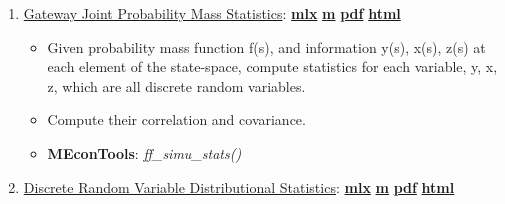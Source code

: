\documentclass[
]{book}
\providecommand{\tightlist}{%
  \setlength{\itemsep}{0pt}\setlength{\parskip}{0pt}}
\begin{document}
\begin{enumerate}
\def\labelenumi{\arabic{enumi}.}
\tightlist
\item
  \href{https://fanwangecon.github.io/MEconTools/MEconTools/doc/stats/htmlpdfm/fx_simu_stats.html}{Gateway Joint Probability Mass Statistics}: \href{https://github.com/FanWangEcon/MEconTools/blob/master/MEconTools/doc/stats/fx_simu_stats.mlx}{\textbf{mlx}} \textbar{} \href{https://github.com/FanWangEcon/MEconTools/blob/master/MEconTools/doc/stats/htmlpdfm/fx_simu_stats.m}{\textbf{m}} \textbar{} \href{https://github.com/FanWangEcon/MEconTools/blob/master/MEconTools/doc/stats/htmlpdfm/fx_simu_stats.pdf}{\textbf{pdf}} \textbar{} \href{https://fanwangecon.github.io/MEconTools/MEconTools/doc/stats/htmlpdfm/fx_simu_stats.html}{\textbf{html}}

  \begin{itemize}
  \tightlist
  \item
    Given probability mass function f(s), and information y(s), x(s), z(s) at each element of the state-space, compute statistics for each variable, y, x, z, which are all discrete random variables.
  \item
    Compute their correlation and covariance.
  \item
    \textbf{MEconTools}: \emph{ff\_simu\_stats()}
  \end{itemize}
\item
  \href{https://fanwangecon.github.io/MEconTools/MEconTools/doc/stats/htmlpdfm/fx_disc_rand_var_stats.html}{Discrete Random Variable Distributional Statistics}: \href{https://github.com/FanWangEcon/MEconTools/blob/master/MEconTools/doc/stats/fx_disc_rand_var_stats.mlx}{\textbf{mlx}} \textbar{} \href{https://github.com/FanWangEcon/MEconTools/blob/master/MEconTools/doc/stats/htmlpdfm/fx_disc_rand_var_stats.m}{\textbf{m}} \textbar{} \href{https://github.com/FanWangEcon/MEconTools/blob/master/MEconTools/doc/stats/htmlpdfm/fx_disc_rand_var_stats.pdf}{\textbf{pdf}} \textbar{} \href{https://fanwangecon.github.io/MEconTools/MEconTools/doc/stats/htmlpdfm/fx_disc_rand_var_stats.html}{\textbf{html}}


\end{enumerate}
\end{document}
